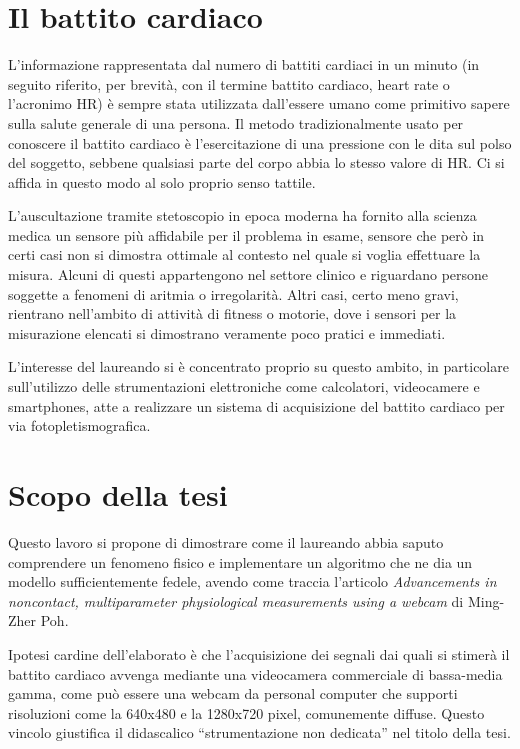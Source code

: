 \section{Il battito cardiaco}
L'informazione rappresentata dal numero di battiti cardiaci in un minuto (in seguito riferito, per brevità, con il termine battito cardiaco, heart rate o l'acronimo HR) è sempre stata utilizzata dall'essere umano come primitivo sapere sulla salute generale di una persona.
Il metodo tradizionalmente usato per conoscere il battito cardiaco è l'esercitazione di una pressione con le dita sul polso del soggetto, sebbene qualsiasi parte del corpo abbia lo stesso valore di HR. Ci si affida in questo modo al solo proprio senso tattile.

L'auscultazione tramite stetoscopio in epoca moderna ha fornito alla scienza medica un sensore più affidabile per il problema in esame, sensore che però in certi casi non si dimostra ottimale al contesto nel quale si voglia effettuare la misura. Alcuni di questi appartengono nel settore clinico e riguardano persone soggette a fenomeni di aritmia o irregolarità. Altri casi, certo meno gravi, rientrano nell'ambito di attività di fitness o motorie, dove i sensori per la misurazione elencati si dimostrano veramente poco pratici e immediati.

L'interesse del laureando si è concentrato proprio su questo ambito, in particolare sull'utilizzo delle strumentazioni elettroniche come calcolatori, videocamere e smartphones, atte a realizzare un sistema di acquisizione del battito cardiaco per via fotopletismografica.
\section{Scopo della tesi}	%
Questo lavoro si propone di dimostrare come il laureando abbia saputo comprendere un fenomeno fisico e implementare un algoritmo che ne dia un modello sufficientemente fedele, avendo come traccia l'articolo {\em Advancements in noncontact, multiparameter physiological measurements using a webcam} \cite{POH11} di Ming-Zher Poh.

Ipotesi cardine dell'elaborato è che l'acquisizione dei segnali dai quali si stimerà il battito cardiaco avvenga mediante una videocamera commerciale di bassa-media gamma, come può essere una webcam da personal computer che supporti risoluzioni come la 640x480 e la 1280x720 pixel, comunemente diffuse. Questo vincolo giustifica il didascalico ``strumentazione non dedicata'' nel titolo della tesi.

